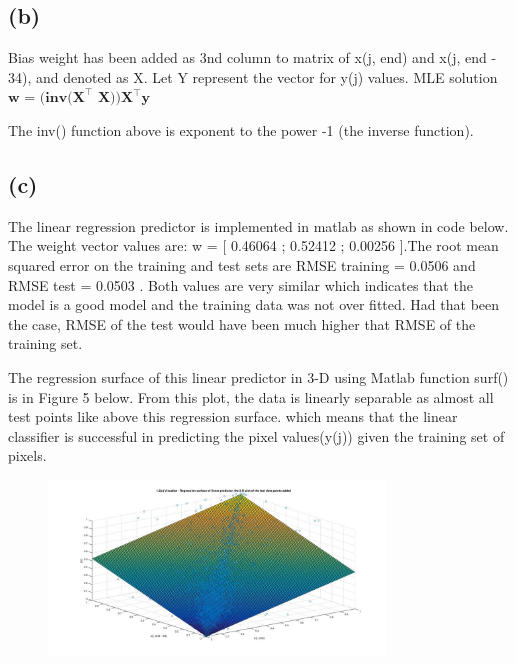 \documentclass[english]{article}
\begin{document}
\subsection*{(b)}
Bias weight has been added as 3nd column to matrix of  x(j, end) and x(j, end - 34),
and denoted as X. Let Y represent the vector for y(j) values.
MLE solution
$\textbf{w}$ = $\textbf{(inv}$$\textbf{(X}^\top$ $\textbf{X))}$$\textbf{X}^\top$$\textbf{y}$

The inv() function above is exponent to the power -1 (the inverse function). 
\subsection*{(c)}
The linear regression predictor is implemented in matlab as shown in code below.
The weight vector values are: w = [ 0.46064 ; 0.52412 ; 0.00256 ].The root mean squared error on the training and test sets are RMSE training = 0.0506  and  RMSE test = 0.0503 . Both values are very similar which indicates that the model is a good model and the training data was not over fitted. Had that been the case, RMSE of the test would have been much higher that RMSE of the training set.

The regression surface of this linear predictor in 3-D using Matlab function surf() is in Figure 5 below. From this plot, the data is linearly separable as almost all test points like above this regression surface. which means that the linear classifier is successful in predicting the pixel values(y(j)) given the training set of pixels.

\begin{figure}[h!]
  \caption{}
  \centering
    \includegraphics[width=0.8\textwidth]{fig_1_2_c.jpg}
\end{figure}
\medskip

\medskip

\end{document}
